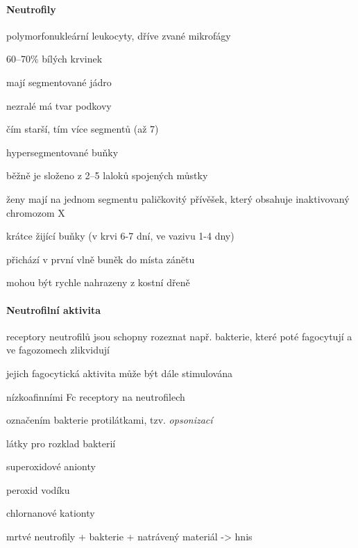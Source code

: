 \documentclass[DIV=8]{scrreprt}
\begin{document}
\paragraph{Neutrofily}
\begin{myItemize}[nosep]
    \item polymorfonukleární leukocyty, dříve zvané mikrofágy
    \item 60--70\%  bílých krvinek
    \item mají segmentované jádro
\begin{myItemize}[nosep]
    \item nezralé má tvar podkovy
    \item čím starší, tím více segmentů (až 7)
\begin{myItemize}[nosep]
    \item hypersegmentované buňky
\end{myItemize}

    \item běžně je složeno z 2--5 laloků spojených můstky
    \item ženy mají na jednom segmentu paličkovitý přívěšek, který obsahuje inaktivovaný chromozom X
\end{myItemize}

    \item krátce žijící buňky (v krvi 6-7 dní, ve vazivu 1-4 dny)
    \item přichází v první vlně buněk do místa zánětu
    \item mohou být rychle nahrazeny z kostní dřeně
\end{myItemize}



\paragraph{Neutrofilní aktivita}
\begin{myItemize}[nosep]
    \item receptory neutrofilů jsou schopny rozeznat např. bakterie, které poté fagocytují a ve fagozomech zlikvidují
    \item jejich fagocytická aktivita může být dále stimulována
\begin{myItemize}[nosep]
    \item nízkoafinními Fc receptory na neutrofilech
    \item označením bakterie protilátkami, tzv. \emph{opsonizací}
\end{myItemize}

    \item látky pro rozklad bakterií
\begin{myItemize}[nosep]
    \item superoxidové anionty
    \item peroxid vodíku
    \item chlornanové kationty
\end{myItemize}

    \item mrtvé neutrofily + bakterie + natrávený materiál -> hnis
\end{myItemize}
\end{document}
